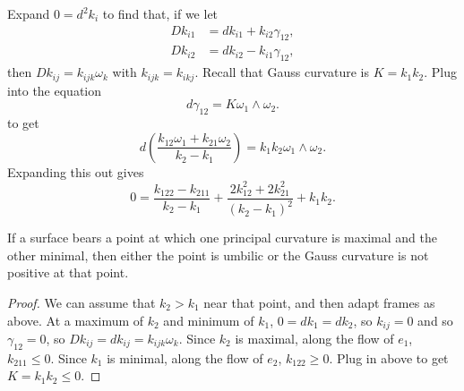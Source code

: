 Expand \(0=d^2k_i\) to find that, if we let
\begin{align*}
Dk_{i1}&=dk_{i1}+k_{i2}\gamma_{12},\\
Dk_{i2}&=dk_{i2}-k_{i1}\gamma_{12},
\end{align*}
then
\(
Dk_{ij}=k_{ijk}\omega_k
\)
with \(k_{ijk}=k_{ikj}\).
Recall that Gauss curvature is \(K=k_1k_2\).
Plug into the equation
\[
d\gamma_{12}=K\omega_1\wedge\omega_2.
\]
to get
\[
d\left(
\frac{k_{12}\omega_1+k_{21}\omega_2}{k_2-k_1}
\right)
=
k_1k_2\omega_1\wedge\omega_2.
\]
Expanding this out gives
\[
0=
\frac{k_{122}-k_{211}}{k_2-k_1}
+\frac{2k^2_{12}+2k^2_{21}}{(k_2-k_1)^2}
+k_1k_2.
\]

\begin{lemma}\label{lemma:max.min.k}
If a surface bears a point at which one principal curvature is maximal and the other minimal, then either the point is umbilic or the Gauss curvature is not positive at that point.
\end{lemma}
\begin{proof}
We can assume that \(k_2>k_1\) near that point, and then adapt frames as above.
At a maximum of \(k_2\) and minimum of \(k_1\), \(0=dk_1=dk_2\), so \(k_{ij}=0\) and so \(\gamma_{12}=0\), so \(Dk_{ij}=dk_{ij}=k_{ijk}\omega_k\).
Since \(k_2\) is maximal, along the flow of \(e_1\), \(k_{211}\le 0\).
Since \(k_1\) is minimal, along the flow of \(e_2\), \(k_{122}\ge 0\).
Plug in above to get \(K=k_1k_2\le 0\).
\end{proof}


